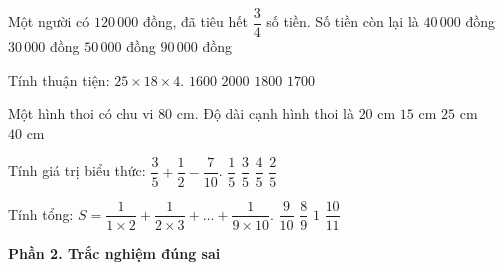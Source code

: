 \begin{ex} %
Một người có $120\,000$ đồng, đã tiêu hết $\dfrac{3}{4}$ số tiền. Số tiền còn lại là
\choice
{$40\,000$ đồng}
{\True $30\,000$ đồng}
{$50\,000$ đồng}
{$90\,000$ đồng}
\end{ex}

\begin{ex} %
Tính thuận tiện: $25 \times 18 \times 4$.
\choice
{$1600$}
{$2000$}
{\True $1800$}
{$1700$}
\end{ex}

\begin{ex} %
Một hình thoi có chu vi $80\text{ cm}$. Độ dài cạnh hình thoi là
\choice
{\True $20\text{ cm}$}
{$15\text{ cm}$}
{$25\text{ cm}$}
{$40\text{ cm}$}
\end{ex}

\begin{ex} %
Tính giá trị biểu thức: $\dfrac{3}{5} + \dfrac{1}{2} - \dfrac{7}{10}$.
\choice
{$\dfrac{1}{5}$}
{$\dfrac{3}{5}$}
{$\dfrac{4}{5}$}
{\True $\dfrac{2}{5}$}
\end{ex}

\begin{ex} %
Tính tổng: $S = \dfrac{1}{1 \times 2} + \dfrac{1}{2 \times 3} + \dots + \dfrac{1}{9 \times 10}$.
\choice
{\True $\dfrac{9}{10}$}
{$\dfrac{8}{9}$}
{$1$}
{$\dfrac{10}{11}$}
\end{ex}

\textbf{Phần 2. Trắc nghiệm đúng sai}

